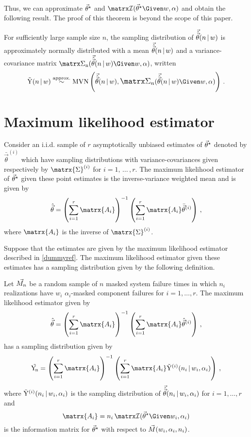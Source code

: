 \documentclass[ ../main.tex]{subfiles}
\begin{document}
\fussy
Thus, we can approximate $\tparam\sysparamvec$ and $\infomatrx(\tparam\sysparamvec \Given w, \alpha)$ and obtain the following result. The proof of this theorem is beyond the scope of this paper.
\begin{theorem}
\label{thm:approx_normal}
For sufficiently large sample size $n$, the sampling distribution of $\mle$ is approximately normally distributed with a mean $\mle$ and a variance-covariance matrix $\cov(\mle \Given w, \alpha)$, written
\begin{equation}
\label{eq:asymptotic_normality}
    \sampd \stackrel{\text{approx.}}{\sim} \mvn\left(\mle, \cov(\mle \Given w, \alpha)\right)\,.
\end{equation}
\end{theorem}

\section{Maximum likelihood estimator}
\label{sec:full_samp_dist}
Consider an i.i.d. sample of $r$ asymptotically unbiased estimates of $\tparam\sysparamvec$ denoted by $\bar{\vec\theta}^{(i)}$ which have sampling distributions with variance-covariances given respectively by $\matrx{\Sigma}^{(i)}$ for $i=1,\,\ldots\,,r$.
The maximum likelihood estimator of $\tparam\sysparamvec$ given these point estimates is the inverse-variance weighted mean and is given by
\begin{equation}
    \hat{\vec\theta} = \left( \sum_{i=1}^{r} \matrx{A_i} \right)^{-1}
    \left( \sum_{i=1}^{r} \matrx{A_i} \bar{\vec\theta}^{(i)} \right)\,,
\end{equation}
where $\matrx{A_i}$ is the inverse of $\matrx{\Sigma}^{(i)}$.

Suppose that the estimates are given by the maximum likelihood estimator described in \cref{dummyref}.
The maximum likelihood estimator given these estimates has a sampling distribution given by the following definition.
\begin{definition}
Let $\mfs$ be a random sample of $n$ masked system failure times in which $n_i$ realizations have $w_i$ $\alpha_i$-masked component failures for $i = 1,\ldots,r$.
The maximum likelihood estimator given by
\begin{equation}
    \hat{\sysparamvec} = \left( \sum_{i=1}^{r} \matrx{A_i} \right)^{-1}
    \left( \sum_{i=1}^{r} \matrx{A_i} \hat\sysparamvec^{(i)} \right)\,,
\end{equation}
has a sampling distribution given by
\begin{equation}
    \sampdu = \left( \sum_{i=1}^{r} \matrx{A_i} \right)^{-1}
    \left( \sum_{i=1}^{r} \matrx{A_i} \sampdir{n_i}{w_i,\alpha_i}{i}\right)\,,
\end{equation}
where $\sampdir{n_i}{w_i,\alpha_i}{i}$ is the sampling distribution of $\mleir{n_i}{w_i,\alpha_i}$ for $i=1,\ldots,r$ and
\begin{equation}
\label{eq:mat_A_info}
    \matrx{A_i} = n_i \infomatrx(\tparam\sysparamvec \Given w_i, \alpha_i)
\end{equation}
is the information matrix for $\tparam\sysparamvec$ with respect to $\mfswn{n_i}{w_i,\alpha_i}$.
\end{definition}
\end{document}
